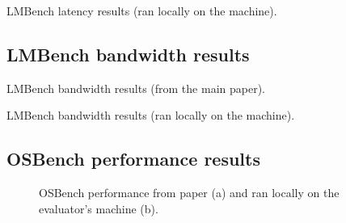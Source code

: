 \begin{table}[!h]
  \caption{LMBench latency results (ran locally on the machine).}
  \begin{center}
  \resizebox{0.5\columnwidth}{!}{%
  
  }
\end{center}
\label{tab:lmbench-performance-local}
\end{table}

\newpage
\subsection{LMBench bandwidth results}

\begin{table}[!h]
  \caption{LMBench bandwidth results (from the main paper).}
  \begin{center}
  \resizebox{0.5\columnwidth}{!}{%
  
  }
\end{center}
\label{tab:lmbench-bandwidth-paper}
\end{table}

\begin{table}[!h]
  \caption{LMBench bandwidth results (ran locally on the machine).}
  \begin{center}
  \resizebox{0.5\columnwidth}{!}{%
  
  }
\end{center}
\label{tab:lmbench-bandwidth-local}
\end{table}

\newpage
\subsection{OSBench performance results}
\begin{figure}[!h]
  \hfill
  \hfill
  \hfill
  \centering
  \caption{OSBench performance from paper (a) and ran locally on the evaluator's machine (b).}
  \label{fig:phoronixosbench}
  \end{figure}
\newpage

